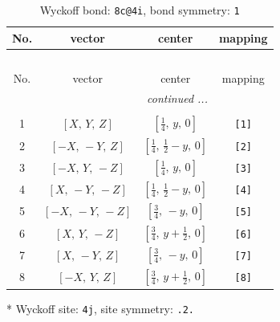 \documentclass[fleqn,8pt]{jsarticle}
\begin{document}
\renewcommand{\arraystretch}{1.2}
\begin{longtable}{cccc}
\caption{Wyckoff bond: {\tt 8c@4i}, bond symmetry: {\tt 1}}
 \\
 \hline \hline
No. & vector & center & mapping \\ \hline \endfirsthead

\multicolumn{3}{l}{\tablename\ \thetable{}} \\
 \hline \hline
No. & vector & center & mapping \\ \hline \endhead

 \hline \hline
\multicolumn{3}{r}{\footnotesize\it continued ...} \\ \endfoot

 \hline \hline
\multicolumn{3}{r}{} \\ \endlastfoot

1 & $\left[ X,\, Y,\, Z \right]$ & $\left[ \frac{1}{4},\, y,\, 0 \right]$ & {\tt [1]} \\ \hline
2 & $\left[ - X,\, - Y,\, Z \right]$ & $\left[ \frac{1}{4},\, \frac{1}{2} - y,\, 0 \right]$ & {\tt [2]} \\ \hline
3 & $\left[ - X,\, Y,\, - Z \right]$ & $\left[ \frac{1}{4},\, y,\, 0 \right]$ & {\tt [3]} \\ \hline
4 & $\left[ X,\, - Y,\, - Z \right]$ & $\left[ \frac{1}{4},\, \frac{1}{2} - y,\, 0 \right]$ & {\tt [4]} \\ \hline
5 & $\left[ - X,\, - Y,\, - Z \right]$ & $\left[ \frac{3}{4},\, - y,\, 0 \right]$ & {\tt [5]} \\ \hline
6 & $\left[ X,\, Y,\, - Z \right]$ & $\left[ \frac{3}{4},\, y + \frac{1}{2},\, 0 \right]$ & {\tt [6]} \\ \hline
7 & $\left[ X,\, - Y,\, Z \right]$ & $\left[ \frac{3}{4},\, - y,\, 0 \right]$ & {\tt [7]} \\ \hline
8 & $\left[ - X,\, Y,\, Z \right]$ & $\left[ \frac{3}{4},\, y + \frac{1}{2},\, 0 \right]$ & {\tt [8]} \\
\end{longtable}
* Wyckoff site: {\tt 4j}, site symmetry: {\tt .2.}
\renewcommand{\arraystretch}{1.2}
\end{document}

